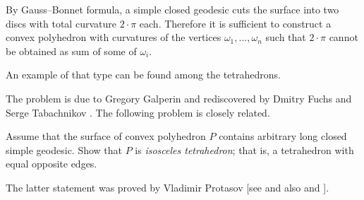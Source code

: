 By Gauss--Bonnet formula, a simple closed geodesic cuts the surface into two discs with total curvature $2\cdot\pi$ each.
Therefore it is sufficient to construct a convex polyhedron with curvatures of the vertices $\omega_1,\dots,\omega_n$ such that
$2\cdot\pi$ cannot be obtained as sum of some of $\omega_i$.

An example of that type can be found among the tetrahedrons.
\qeds

The problem is due to Gregory Galperin \cite[see][]{galperin} 
and rediscovered by Dmitry Fuchs and Serge Tabachnikov \cite[see 20.8 in][]{fuchs-tabachnikov}.
The following problem is closely related.

\begin{pr}
Assume that the surface of convex polyhedron $P$ contains arbitrary long closed simple geodesic. 
Show that $P$ is \emph{isosceles tetrahedron};
that is, a tetrahedron with equal opposite edges.
\end{pr}

The latter statement was proved by Vladimir Protasov [see  and also  and ].

